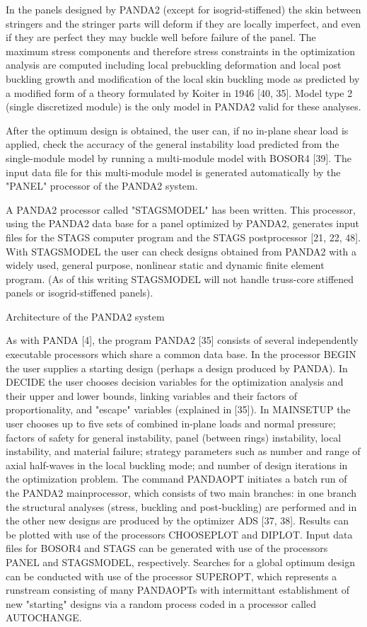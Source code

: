 In the panels designed by PANDA2 (except for isogrid-stiffened) the skin
between stringers and the stringer parts will deform if they are locally
imperfect, and even if they are perfect they may buckle well before
failure of the panel. The maximum stress components and therefore stress
constraints in the optimization analysis are computed including local
prebuckling deformation and local post buckling growth and modification of
the local skin buckling mode as predicted by a modified form of a theory
formulated by Koiter in 1946 [40, 35]. Model type 2 (single discretized
module) is the only model in PANDA2 valid for these analyses. 

After the optimum design is obtained, the user can, if no in-plane shear
load is applied, check the accuracy of the general instability load
predicted from the single-module model by running a multi-module model
with BOSOR4 [39].  The input data file for this multi-module model is
generated automatically by the "PANEL" processor of the PANDA2 system. 

A PANDA2 processor called "STAGSMODEL" has been written.  This processor,
using the PANDA2 data base for a panel optimized by PANDA2, generates
input files for the STAGS computer program and the STAGS postprocessor
[21, 22, 48].  With STAGSMODEL the user can check designs obtained from
PANDA2 with a widely used, general purpose, nonlinear static and dynamic
finite element program. (As of this writing STAGSMODEL will not handle
truss-core stiffened panels or isogrid-stiffened panels). 


Architecture of the PANDA2 system

As with PANDA [4], the program PANDA2 [35] consists of several
independently executable processors which share a common data base. In the
processor BEGIN the user supplies a starting design (perhaps a design
produced by PANDA).  In DECIDE the user chooses decision variables for the
optimization analysis and their upper and lower bounds, linking variables
and their factors of proportionality, and "escape" variables (explained in
[35]). In MAINSETUP the user chooses up to five sets of combined in-plane
loads and normal pressure; factors of safety for general instability,
panel (between rings) instability, local instability, and material
failure; strategy parameters such as number and range of axial half-waves
in the local buckling mode; and number of design iterations in the
optimization problem. The command PANDAOPT initiates a batch run of the
PANDA2 mainprocessor, which consists of two main branches:  in one branch
the structural analyses (stress, buckling and post-buckling) are performed
and in the other new designs are produced by the optimizer ADS [37, 38]. 
Results can be plotted with use of the processors CHOOSEPLOT and DIPLOT.
Input data files for BOSOR4 and STAGS can be generated with use of the
processors PANEL and STAGSMODEL, respectively. Searches for a global
optimum design can be conducted with use of the processor SUPEROPT, which
represents a runstream consisting of many PANDAOPTs with intermittant
establishment of new "starting" designs via a random process coded in
a processor called AUTOCHANGE.



